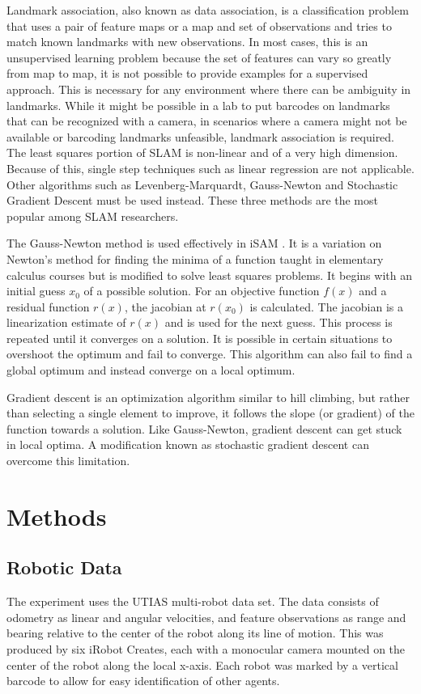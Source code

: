 \documentclass[12pt]{report}
\begin{document}
Landmark association, also known as data association, is a
classification problem that uses a pair of feature maps or a map and
set of observations and tries to match known landmarks with new
observations. In most cases, this is an unsupervised learning problem
because the set of features can vary so greatly from map to map, it is
not possible to provide examples for a supervised approach. This is
necessary for any environment where there can be ambiguity in
landmarks. While it might be possible in a lab to put barcodes on
landmarks that can be recognized with a camera, in scenarios where a
camera might not be available or barcoding landmarks unfeasible,
landmark association is required. The least squares portion of SLAM is
non-linear and of a very high dimension. Because of this, single step
techniques such as linear regression are not applicable. Other
algorithms such as Levenberg-Marquardt, Gauss-Newton and Stochastic
Gradient Descent must be used instead. These three methods are the
most popular among SLAM researchers.

The Gauss-Newton method is used effectively in iSAM \cite{isam}. It is
a variation on Newton’s method for finding the minima of a function
taught in elementary calculus courses but is modified to solve least
squares problems. It begins with an initial guess $x_0$ of a possible
solution. For an objective function $f(x)$ and a residual function
$r(x)$, the jacobian at $r(x_0)$ is calculated. The jacobian is a
linearization estimate of $r(x)$ and is used for the next guess. This
process is repeated until it converges on a solution. It is possible
in certain situations to overshoot the optimum and fail to converge.
This algorithm can also fail to find a global optimum and instead
converge on a local optimum.

Gradient descent is an optimization algorithm similar to hill
climbing, but rather than selecting a single element to improve, it
follows the slope (or gradient) of the function towards a solution.
Like Gauss-Newton, gradient descent can get stuck in local optima. A
modification known as stochastic gradient descent can overcome this
limitation.


\chapter{Methods}
\section{Robotic Data}
The experiment uses the UTIAS multi-robot data set. The data consists
of odometry as linear and angular velocities, and feature observations
as range and bearing relative to the center of the robot along its
line of motion. This was produced by six iRobot Creates, each with a
monocular camera mounted on the center of the robot along the local
x-axis. Each robot was marked by a vertical barcode to allow for easy
identification of other agents.
\end{document}
